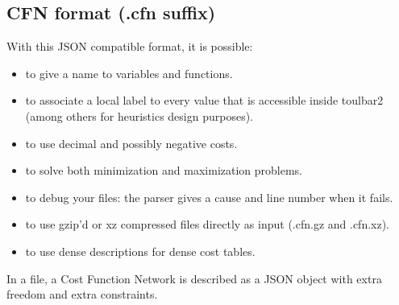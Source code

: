 \documentclass[letterpaper,10pt,openany,oneside,english]{sphinxmanual}
\begin{document}
\subsection{CFN format (.cfn suffix)}
\label{\detokenize{formats/cfnformat:cfn-format-cfn-suffix}}\label{\detokenize{formats/cfnformat:cfn-format}}\label{\detokenize{formats/cfnformat::doc}}
\sphinxAtStartPar
With this JSON compatible format, it is possible:
\begin{itemize}
\item {} 
\sphinxAtStartPar
to give a name to variables and functions.

\item {} 
\sphinxAtStartPar
to associate a local label to every value that is accessible inside toulbar2 (among others for heuristics design purposes).

\item {} 
\sphinxAtStartPar
to use decimal and possibly negative costs.

\item {} 
\sphinxAtStartPar
to solve both minimization and maximization problems.

\item {} 
\sphinxAtStartPar
to debug your  files: the parser gives a cause and line number when it fails.

\item {} 
\sphinxAtStartPar
to use gzip’d or xz compressed files directly as input (.cfn.gz and .cfn.xz).

\item {} 
\sphinxAtStartPar
to use dense descriptions for dense cost tables.

\end{itemize}

\sphinxAtStartPar
In a  file, a Cost Function Network is described as a JSON object with extra freedom and extra constraints.
\end{document}
